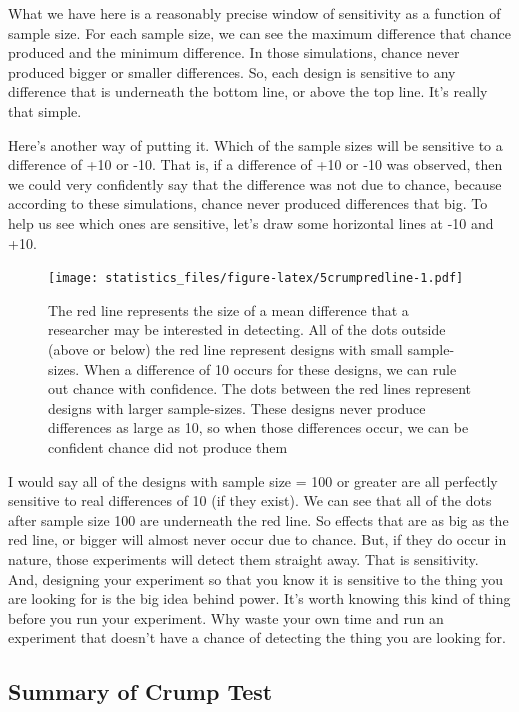 \documentclass[]{book}
\begin{document}
What we have here is a reasonably precise window of sensitivity as a function of sample size. For each sample size, we can see the maximum difference that chance produced and the minimum difference. In those simulations, chance never produced bigger or smaller differences. So, each design is sensitive to any difference that is underneath the bottom line, or above the top line. It's really that simple.

Here's another way of putting it. Which of the sample sizes will be sensitive to a difference of +10 or -10. That is, if a difference of +10 or -10 was observed, then we could very confidently say that the difference was not due to chance, because according to these simulations, chance never produced differences that big. To help us see which ones are sensitive, let's draw some horizontal lines at -10 and +10.

\begin{figure}
\centering
\texttt{[image: statistics\_files/figure-latex/5crumpredline-1.pdf]}
\caption{\label{fig:5crumpredline}The red line represents the size of a mean difference that a researcher may be interested in detecting. All of the dots outside (above or below) the red line represent designs with small sample-sizes. When a difference of 10 occurs for these designs, we can rule out chance with confidence. The dots between the red lines represent designs with larger sample-sizes. These designs never produce differences as large as 10, so when those differences occur, we can be confident chance did not produce them}
\end{figure}

I would say all of the designs with sample size = 100 or greater are all perfectly sensitive to real differences of 10 (if they exist). We can see that all of the dots after sample size 100 are underneath the red line. So effects that are as big as the red line, or bigger will almost never occur due to chance. But, if they do occur in nature, those experiments will detect them straight away. That is sensitivity. And, designing your experiment so that you know it is sensitive to the thing you are looking for is the big idea behind power. It's worth knowing this kind of thing before you run your experiment. Why waste your own time and run an experiment that doesn't have a chance of detecting the thing you are looking for.

\hypertarget{summary-of-crump-test}{%
\subsection{Summary of Crump Test}\label{summary-of-crump-test}}
\end{document}
